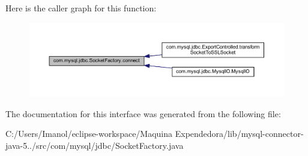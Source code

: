 Here is the caller graph for this function\+:
\nopagebreak
\begin{figure}[H]
\begin{center}
\leavevmode
\includegraphics[width=350pt]{interfacecom_1_1mysql_1_1jdbc_1_1_socket_factory_a2e5061cef1109ab4689437fe177c4ffe_icgraph}
\end{center}
\end{figure}


The documentation for this interface was generated from the following file\+:\begin{DoxyCompactItemize}
\item 
C\+:/\+Users/\+Imanol/eclipse-\/workspace/\+Maquina Expendedora/lib/mysql-\/connector-\/java-\/5../src/com/mysql/jdbc/Socket\+Factory.\+java\end{DoxyCompactItemize}
